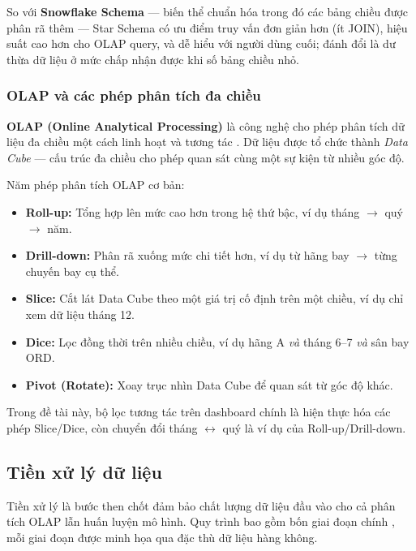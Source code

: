 So với \textbf{Snowflake Schema} --- biến thể chuẩn hóa trong đó các bảng chiều
được phân rã thêm --- Star Schema có ưu điểm truy vấn đơn giản hơn (ít JOIN),
hiệu suất cao hơn cho OLAP query, và dễ hiểu với người dùng cuối;
đánh đổi là dư thừa dữ liệu ở mức chấp nhận được khi số bảng chiều nhỏ.

\subsubsection{OLAP và các phép phân tích đa chiều}

\textbf{OLAP (Online Analytical Processing)} là công nghệ cho phép
phân tích dữ liệu đa chiều một cách linh hoạt và tương tác \cite{codd1993olap}.
Dữ liệu được tổ chức thành \textit{Data Cube} ---
cấu trúc đa chiều cho phép quan sát cùng một sự kiện từ nhiều góc độ.

Năm phép phân tích OLAP cơ bản:
\begin{itemize}
    \item \textbf{Roll-up:} Tổng hợp lên mức cao hơn trong hệ thứ bậc,
          ví dụ tháng $\rightarrow$ quý $\rightarrow$ năm.
    \item \textbf{Drill-down:} Phân rã xuống mức chi tiết hơn,
          ví dụ từ hãng bay $\rightarrow$ từng chuyến bay cụ thể.
    \item \textbf{Slice:} Cắt lát Data Cube theo một giá trị cố định
          trên một chiều, ví dụ chỉ xem dữ liệu tháng 12.
    \item \textbf{Dice:} Lọc đồng thời trên nhiều chiều,
          ví dụ hãng A \textit{và} tháng 6--7 \textit{và} sân bay ORD.
    \item \textbf{Pivot (Rotate):} Xoay trục nhìn Data Cube
          để quan sát từ góc độ khác.
\end{itemize}

Trong đề tài này, bộ lọc tương tác trên dashboard chính là
hiện thực hóa các phép Slice/Dice, còn chuyển đổi tháng $\leftrightarrow$ quý
là ví dụ của Roll-up/Drill-down.

\subsection{Tiền xử lý dữ liệu}
\label{subsec:preprocess}

Tiền xử lý là bước then chốt đảm bảo chất lượng dữ liệu đầu vào
cho cả phân tích OLAP lẫn huấn luyện mô hình.
Quy trình bao gồm bốn giai đoạn chính \cite{han2011datamining},
mỗi giai đoạn được minh họa qua đặc thù dữ liệu hàng không.

